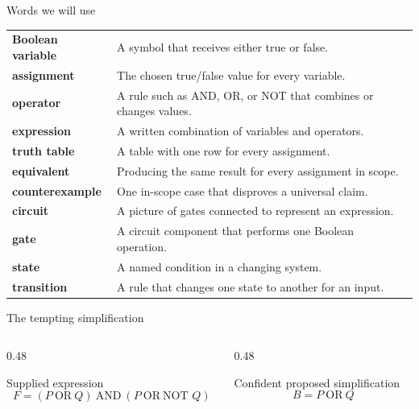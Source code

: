 \begin{frame}{Words we will use}
\begin{tabular}{@{}p{3.0cm}p{9.8cm}@{}}
\textbf{Boolean variable} & A symbol that receives either true or false.\\[2pt]
\textbf{assignment} & The chosen true/false value for every variable.\\[2pt]
\textbf{operator} & A rule such as AND, OR, or NOT that combines or changes values.\\[2pt]
\textbf{expression} & A written combination of variables and operators.\\[2pt]
\textbf{truth table} & A table with one row for every assignment.\\[2pt]
\textbf{equivalent} & Producing the same result for every assignment in scope.\\[2pt]
\textbf{counterexample} & One in-scope case that disproves a universal claim.\\[2pt]
\textbf{circuit} & A picture of gates connected to represent an expression.\\[2pt]
\textbf{gate} & A circuit component that performs one Boolean operation.\\[2pt]
\textbf{state} & A named condition in a changing system.\\[2pt]
\textbf{transition} & A rule that changes one state to another for an input.\\[2pt]
\end{tabular}
\end{frame}

\begin{frame}{The tempting simplification}
\begin{columns}[T]
\begin{column}{0.48\textwidth}
\begin{block}{Supplied expression}
\[
F=(P\ \text{OR}\ Q)\ \text{AND}\ (P\ \text{OR}\ \text{NOT }Q)
\]
\end{block}
\end{column}
\begin{column}{0.48\textwidth}
\begin{alertblock}{Confident proposed simplification}
\[
B=P\ \text{OR}\ Q
\]
\end{alertblock}
\end{column}
\end{columns}
\end{frame}
